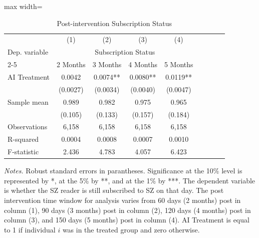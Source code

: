  \begin{table} [H]
 \centering 
 \caption{Post-intervention Subscription Status} 
 \label{tab:subscription} 
 \begin{adjustbox}{max width=\textwidth} 
\def\sym#1{\ifmmode^{#1}\else\(^{#1}\)\fi}
\begin{tabular}{l*{8}{c}}
\toprule
 \midrule
 &\multicolumn{1}{c}{(1)} &\multicolumn{1}{c}{(2)} &\multicolumn{1}{c}{(3)} &\multicolumn{1}{c}{(4)}  \\
\multicolumn{1}{l}{Dep. variable} &\multicolumn{4}{c}{Subscription Status}  \\
\cmidrule(lr){2-5}
\multicolumn{1}{c}{Months Post-Intervention} &\multicolumn{1}{c}{2 Months} &\multicolumn{1}{c}{3 Months} &\multicolumn{1}{c}{4 Months} &\multicolumn{1}{c}{5 Months}  \\
\midrule
\addlinespace
AI Treatment    &   0.0042   &   0.0074** &   0.0080** &   0.0119** \\
                & (0.0027)   & (0.0034)   & (0.0040)   & (0.0047)   \\
\addlinespace
Sample mean&      0.989 &      0.982 &      0.975 &      0.965  \\
& (0.105) & (0.133) & (0.157) & (0.184)  \\
\midrule
Observations &      6,158 &       6,158  &      6,158 &      6,158  \\
R-squared &     0.0004 &      0.0008  &     0.0007 &     0.0010  \\
F-statistic &      2.436 &       4.783  &      4.057 &      6.423 \\
\midrule
\bottomrule
\end{tabular}
 \end{adjustbox}
 \par
 \begin{minipage}{0.88\linewidth}
 \baselineskip9pt {\scriptsize \vspace{0.1cm} { \it Notes.} Robust standard errors in parantheses. Significance at the 10\% level is represented by *, at the 5\% by **, and at the 1\% by ***. The dependent variable is whether the SZ reader is still subscribed to SZ on that day. The post intervention time window for analysis varies from  60 days (2 months) post in column (1), 90 days (3 months) post in column (2), 120 days (4 months) post in column (3), and 150 days (5 months) post in column (4). AI Treatment is equal to 1 if individual $i$ was in the treated group and zero otherwise.}
 \end{minipage}
 \end{table}
